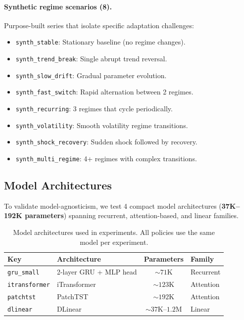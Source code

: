 \documentclass[11pt,a4paper]{article}
\begin{document}
\paragraph{Synthetic regime scenarios (8).} Purpose-built series that isolate specific adaptation challenges:
\begin{itemize}[nosep]
  \item \texttt{synth\_stable}: Stationary baseline (no regime changes).
  \item \texttt{synth\_trend\_break}: Single abrupt trend reversal.
  \item \texttt{synth\_slow\_drift}: Gradual parameter evolution.
  \item \texttt{synth\_fast\_switch}: Rapid alternation between 2 regimes.
  \item \texttt{synth\_recurring}: 3 regimes that cycle periodically.
  \item \texttt{synth\_volatility}: Smooth volatility regime transitions.
  \item \texttt{synth\_shock\_recovery}: Sudden shock followed by recovery.
  \item \texttt{synth\_multi\_regime}: 4+ regimes with complex transitions.
\end{itemize}

\subsection{Model Architectures}

To validate model-agnosticism, we test 4 compact model architectures (\textbf{37K--192K parameters}) spanning recurrent, attention-based, and linear families.

\begin{table}[t]
\centering
\caption{Model architectures used in experiments. All policies use the same model per experiment.}
\label{tab:models}
\small
\begin{tabular}{llcl}
\toprule
Key & Architecture & Parameters & Family \\
\midrule
\texttt{gru\_small} & 2-layer GRU + MLP head & ${\sim}71$K & Recurrent \\
\texttt{itransformer} & iTransformer~\citep{liu2024itransformer} & ${\sim}123$K & Attention \\
\texttt{patchtst} & PatchTST~\citep{nie2023patchtst} & ${\sim}192$K & Attention \\
\texttt{dlinear} & DLinear~\citep{zeng2023dlinear} & ${\sim}37$K--$1.2$M & Linear \\
\bottomrule
\end{tabular}
\end{table}
\end{document}
